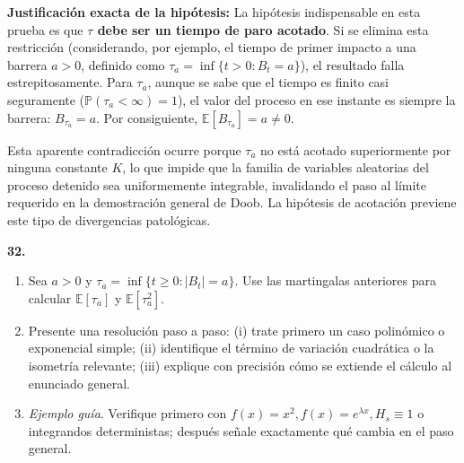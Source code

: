 \documentclass[11pt, letterpaper]{article}
\begin{document}
\begin{solucion}
    \textbf{Justificación exacta de la hipótesis:}
    La hipótesis indispensable en esta prueba es que \textbf{$\tau$ debe ser un tiempo de paro acotado}. Si se elimina esta restricción (considerando, por ejemplo, el tiempo de primer impacto a una barrera $a > 0$, definido como $\tau_a = \inf\{t > 0 : B_t = a\}$), el resultado falla estrepitosamente. Para $\tau_a$, aunque se sabe que el tiempo es finito casi seguramente ($\mathbb{P}(\tau_a < \infty) = 1$), el valor del proceso en ese instante es siempre la barrera: $B_{\tau_a} = a$. Por consiguiente, $\mathbb{E}[B_{\tau_a}] = a \neq 0$. 
    
    Esta aparente contradicción ocurre porque $\tau_a$ no está acotado superiormente por ninguna constante $K$, lo que impide que la familia de variables aleatorias del proceso detenido sea uniformemente integrable, invalidando el paso al límite requerido en la demostración general de Doob. La hipótesis de acotación previene este tipo de divergencias patológicas.
\end{solucion}

\newpage

\begin{ejercicio}
    \textbf{32.} 
    \begin{enumerate}
        \item Sea $a > 0$ y $\tau_a = \inf\{t \ge 0 : |B_t| = a\}$. Use las martingalas anteriores para calcular $\mathbb{E}[\tau_a]$ y $\mathbb{E}[\tau_a^2]$.
        \item Presente una resolución paso a paso: (i) trate primero un caso polinómico o exponencial simple; (ii) identifique el término de variación cuadrática o la isometría relevante; (iii) explique con precisión cómo se extiende el cálculo al enunciado general.
        \item \textit{Ejemplo guía}. Verifique primero con $f(x) = x^2, f(x) = e^{\lambda x}, H_s \equiv 1$ o integrandos deterministas; después señale exactamente qué cambia en el paso general.
    \end{enumerate}
\end{ejercicio}

\vspace{5mm}
\end{document}
